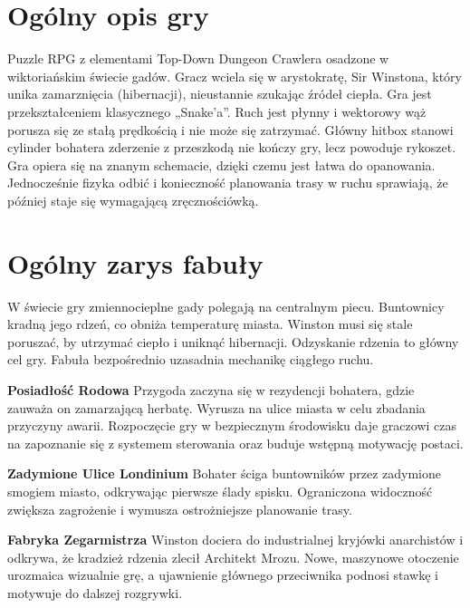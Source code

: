 \documentclass[12pt, letterpaper,Titlepage]{article}
\begin{document}
\newpage
{
\singlespacing
\small %
\tableofcontents
}
\thispagestyle{empty}


\newpage
\section {Ogólny opis gry}
 {Puzzle RPG z elementami Top-Down Dungeon Crawlera} osadzone w wiktoriańskim świecie gadów. Gracz wciela się w arystokratę, Sir Winstona, który unika zamarznięcia (hibernacji), nieustannie szukając źródeł ciepła.
Gra jest przekształceniem klasycznego „Snake’a”. Ruch jest płynny i wektorowy wąż porusza się ze stałą prędkością i nie może się zatrzymać. Główny hitbox stanowi cylinder bohatera zderzenie z przeszkodą nie kończy gry, lecz powoduje rykoszet. Gra opiera się na znanym schemacie, dzięki czemu jest łatwa do opanowania. Jednocześnie fizyka odbić i konieczność planowania trasy w ruchu sprawiają, że później staje się wymagającą zręcznościówką.

\section {Ogólny zarys fabuły}
W świecie gry zmiennocieplne gady polegają na centralnym piecu. Buntownicy kradną jego rdzeń, co obniża temperaturę miasta. Winston musi się stale poruszać, by utrzymać ciepło i uniknąć hibernacji. Odzyskanie rdzenia to główny cel gry. Fabuła bezpośrednio uzasadnia mechanikę ciągłego ruchu.

\vspace{1cm} 
\textbf{Posiadłość Rodowa}
Przygoda zaczyna się w rezydencji bohatera, gdzie zauważa on zamarzającą herbatę. Wyrusza na ulice miasta w celu zbadania przyczyny awarii. Rozpoczęcie gry w bezpiecznym środowisku daje graczowi czas na zapoznanie się z systemem sterowania oraz buduje wstępną motywację postaci.
\vspace{1cm}

\textbf{Zadymione Ulice Londinium}
Bohater ściga buntowników przez zadymione smogiem miasto, odkrywając pierwsze ślady spisku. Ograniczona widoczność zwiększa zagrożenie i wymusza ostrożniejsze planowanie trasy.
\vspace{1cm}

\textbf{Fabryka Zegarmistrza}
Winston dociera do industrialnej kryjówki anarchistów i odkrywa, że kradzież rdzenia zlecił Architekt Mrozu. Nowe, maszynowe otoczenie urozmaica wizualnie grę, a ujawnienie głównego przeciwnika podnosi stawkę i motywuje do dalszej rozgrywki.
\vspace{1cm}
\end{document}
